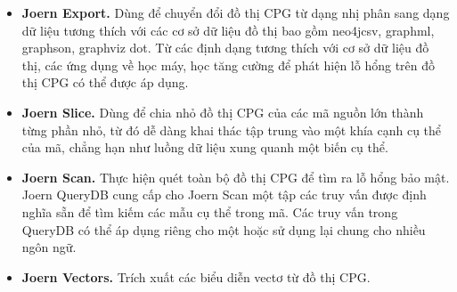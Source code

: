 \begin{itemize}
  \item \textbf{Joern Export.} Dùng để chuyển đổi đồ thị CPG từ dạng nhị phân sang dạng dữ liệu tương thích với các cơ sở dữ liệu đồ thị bao gồm neo4jcsv, graphml, graphson, graphviz dot.
  Từ các định dạng tương thích với cơ sở dữ liệu đồ thị, các ứng dụng về học máy, học tăng cường để phát hiện lỗ hổng trên đồ thị CPG có thể được áp dụng.
  \item \textbf{Joern Slice.} Dùng để chia nhỏ đồ thị CPG của các mã nguồn lớn thành từng phần nhỏ, từ đó dễ dàng khai thác tập trung vào một khía cạnh cụ thể của mã, chẳng hạn như luồng dữ liệu xung quanh một biến cụ thể.
  \item \textbf{Joern Scan.} Thực hiện quét toàn bộ đồ thị CPG để tìm ra lỗ hổng bảo mật.
  Joern QueryDB \cite{joernJoernQuery} cung cấp cho Joern Scan một tập các truy vấn được định nghĩa sẵn để tìm kiếm các mẫu cụ thể trong mã.
  Các truy vấn trong QueryDB có thể áp dụng riêng cho một hoặc sử dụng lại chung cho nhiều ngôn ngữ.
  \item \textbf{Joern Vectors.} Trích xuất các biểu diễn vectơ từ đồ thị CPG.
\end{itemize}
